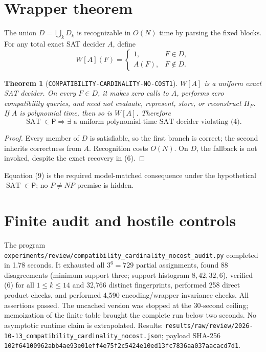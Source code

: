 \documentclass[11pt]{article}
\newtheorem{theorem}{Theorem}
\begin{document}
\section{Wrapper theorem}
The union \(D=\bigcup_kD_k\) is recognizable in \(O(N)\) time by parsing the
fixed blocks.  For any total exact SAT decider \(A\), define
\[
W[A](F)=\begin{cases}1,&F\in D,\\ A(F),&F\notin D.\end{cases} \tag{8}
\]
\begin{theorem}[\texttt{COMPATIBILITY-CARDINALITY-NO-COST1}]
\(W[A]\) is a uniform exact SAT decider.  On every \(F\in D\), it makes zero
calls to \(A\), performs zero compatibility queries, and need not evaluate,
represent, store, or reconstruct \(H_F\).  If \(A\) is polynomial time, then
so is \(W[A]\).  Therefore
\[
\operatorname{SAT}\in\mathsf P\Longrightarrow
\exists\text{ a uniform polynomial-time SAT decider violating (4).}       \tag{9}
\]
\end{theorem}
\begin{proof}
Every member of \(D\) is satisfiable, so the first branch is correct; the
second inherits correctness from \(A\).  Recognition costs \(O(N)\).  On
\(D\), the fallback is not invoked, despite the exact recovery in (6).
\end{proof}
Equation (9) is the required model-matched consequence under the hypothetical
\(\operatorname{SAT}\in\mathsf P\); no \(P\ne NP\) premise is hidden.

\section{Finite audit and hostile controls}
The program
\texttt{experiments/review/compatibility\_cardinality\_nocost\_audit.py}
completed in 1.78 seconds.  It exhausted all \(3^6=729\) partial assignments,
found 88 disagreements (minimum support three; support histogram
\(8,42,32,6\)), verified (6) for all \(1\le k\le14\) and 32,766 distinct
fingerprints, performed 258 direct product checks, and performed 4,590
encoding/wrapper invariance checks.  All assertions passed.  The uncached
version was stopped at the 30-second ceiling; memoization of the finite table
brought the complete run below two seconds.  No asymptotic runtime claim is
extrapolated.  Results:
\texttt{results/raw/review/2026-10-13\_compatibility\_cardinality\_nocost.json};
payload SHA-256
\texttt{102f64100962abb4ae93e01eff4e75f2c5424e10ed13fc7836aa037aacacd7d1}.
\end{document}
